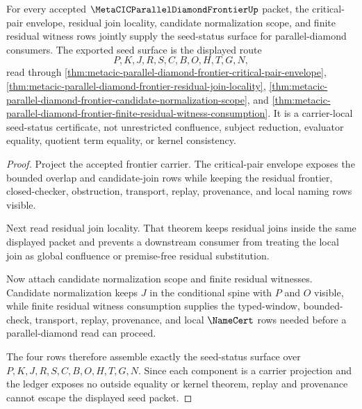 \begin{theorem}
\label{thm:metacic-parallel-diamond-seed-status}
For every accepted $\MetaCICParallelDiamondFrontierUp$ packet, the critical-pair envelope, residual join locality, candidate normalization scope, and finite residual witness rows jointly supply the seed-status surface for parallel-diamond consumers. The exported seed surface is the displayed route
$$
P,K,J,R,S,C,B,O,H,T,G,N ,
$$
read through \autoref{thm:metacic-parallel-diamond-frontier-critical-pair-envelope}, \autoref{thm:metacic-parallel-diamond-frontier-residual-join-locality}, \autoref{thm:metacic-parallel-diamond-frontier-candidate-normalization-scope}, and \autoref{thm:metacic-parallel-diamond-frontier-finite-residual-witness-consumption}. It is a carrier-local seed-status certificate, not unrestricted confluence, subject reduction, evaluator equality, quotient term equality, or kernel consistency.
\end{theorem}
\begin{proof}
Project the accepted frontier carrier. The critical-pair envelope exposes the bounded overlap and candidate-join rows while keeping the residual frontier, closed-checker, obstruction, transport, replay, provenance, and local naming rows visible.

Next read residual join locality. That theorem keeps residual joins inside the same displayed packet and prevents a downstream consumer from treating the local join as global confluence or premise-free residual substitution.

Now attach candidate normalization scope and finite residual witnesses. Candidate normalization keeps $J$ in the conditional spine with $P$ and $O$ visible, while finite residual witness consumption supplies the typed-window, bounded-check, transport, replay, provenance, and local $\NameCert$ rows needed before a parallel-diamond read can proceed.

The four rows therefore assemble exactly the seed-status surface over $P,K,J,R,S,C,B,O,H,T,G,N$. Since each component is a carrier projection and the ledger exposes no outside equality or kernel theorem, replay and provenance cannot escape the displayed seed packet.
\end{proof}


